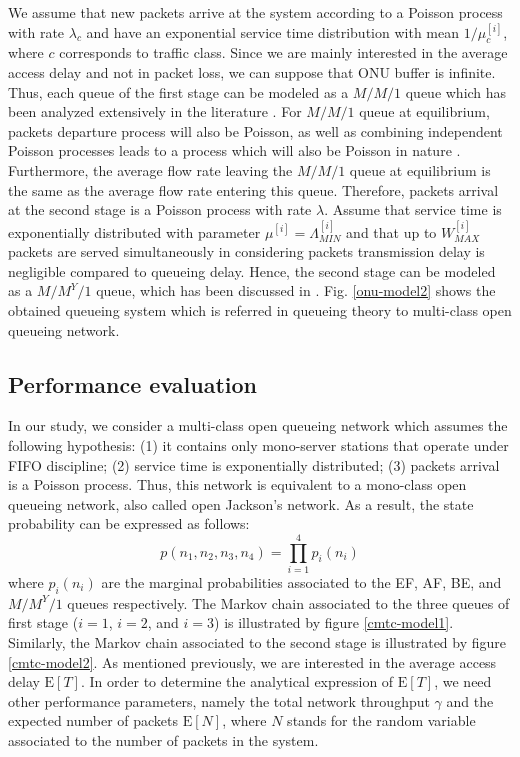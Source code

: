 \documentclass[a4paper,10pt]{IEEEtran}
\begin{document}
We assume that new packets arrive at the system according to a
Poisson process with rate $\lambda_{c}$ and have an exponential
service time distribution with mean $1/\mu_{c}^{[i]}$, where $c$
corresponds to traffic class. Since we are mainly interested in the
average access delay and not in packet loss, we can suppose that ONU
buffer is infinite. Thus, each queue of the first stage can be
modeled as a $M/M/1$ queue which has been analyzed extensively in
the literature \cite{Baynat:2000, Pujolle:1989}. For $M/M/1$ queue
at equilibrium, packets departure process will also be Poisson, as
well as combining independent Poisson processes leads to a process
which will also be Poisson in nature \cite{Baynat:2000}.
Furthermore, the average flow rate leaving the $M/M/1$ queue at
equilibrium is the same as the average flow rate entering this
queue. Therefore, packets arrival at the second stage is a Poisson
process with rate $\lambda$. Assume that service time is
exponentially distributed with parameter
$\mu^{[i]}=\Lambda_{MIN}^{[i]}$ and that up to $W_{MAX}^{[i]}$
packets are served simultaneously in considering packets
transmission delay is negligible compared to queueing delay. Hence,
the second stage can be modeled as a $M/M^{Y}/1$ queue, which has
been discussed in \cite{Pujolle:1989}. Fig. \ref{onu-model2} shows
the obtained queueing system which is referred in queueing theory to
multi-class open queueing network.
\subsection{Performance evaluation}
In our study, we consider a multi-class open queueing network which
assumes the following hypothesis: (1) it contains only mono-server
stations that operate under FIFO discipline; (2) service time is
exponentially distributed; (3) packets arrival is a Poisson process.
Thus, this network is equivalent to a mono-class open queueing
network, also called open Jackson's network. As a result, the state
probability can be expressed as follows:
\begin{equation}
p(n_{1}, n_{2}, n_{3},n_{4}) = \prod_{i=1}^{4} p_{i}(n_{i})
\end{equation}
where $p_{i}(n_{i})$ are the marginal probabilities associated to
the EF, AF, BE, and $M/M^{Y}/1$ queues respectively. The Markov
chain associated to the three queues of first stage ($i=1$, $i=2$,
and $i=3$) is illustrated by figure \ref{cmtc-model1}. Similarly,
the Markov chain associated to the second stage is illustrated by
figure \ref{cmtc-model2}. As mentioned previously, we are interested
in the average access delay $\text{E}[T]$. In order to determine the
analytical expression of $\text{E}[T]$, we need other performance
parameters, namely the total network throughput $\gamma$ and the
expected number of packets $\text{E}[N]$, where $N$ stands for the
random variable associated to the number of packets in the
system.\medskip
\end{document}
